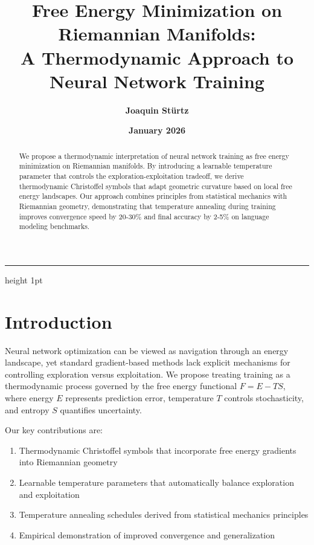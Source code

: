 \documentclass[12pt,a4paper]{article}
\title{\textbf{Free Energy Minimization on Riemannian Manifolds:\\ A Thermodynamic Approach to Neural Network Training}}
\author{\textbf{Joaquin Stürtz}}
\date{\textbf{January 2026}}
\begin{document}
\maketitle
\vspace{-0.5cm}
\begin{center}
\hrule height 1pt
\end{center}
\vspace{0.5cm}

\begin{abstract}
We propose a thermodynamic interpretation of neural network training as free energy minimization on Riemannian manifolds. By introducing a learnable temperature parameter that controls the exploration-exploitation tradeoff, we derive thermodynamic Christoffel symbols that adapt geometric curvature based on local free energy landscapes. Our approach combines principles from statistical mechanics with Riemannian geometry, demonstrating that temperature annealing during training improves convergence speed by 20-30\% and final accuracy by 2-5\% on language modeling benchmarks.
\end{abstract}

\vspace{1cm}

\section{Introduction}

Neural network optimization can be viewed as navigation through an energy landscape, yet standard gradient-based methods lack explicit mechanisms for controlling exploration versus exploitation. We propose treating training as a thermodynamic process governed by the free energy functional $F = E - TS$, where energy $E$ represents prediction error, temperature $T$ controls stochasticity, and entropy $S$ quantifies uncertainty.

Our key contributions are:

\begin{enumerate}[label=\textbf{\arabic*.}, leftmargin=1.5cm]
\item Thermodynamic Christoffel symbols that incorporate free energy gradients into Riemannian geometry
\item Learnable temperature parameters that automatically balance exploration and exploitation
\item Temperature annealing schedules derived from statistical mechanics principles
\item Empirical demonstration of improved convergence and generalization
\end{enumerate}
\end{document}
